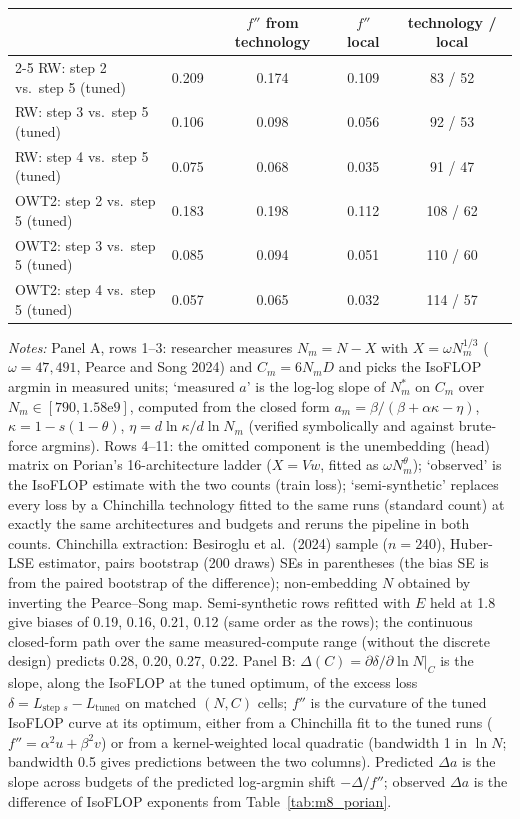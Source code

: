 \begin{table}[htbp]
\begin{threeparttable}
\begin{tabular}{p{6.0cm}cccc}
 & & $f''$ from technology & $f''$ local & technology / local  \\
\cmidrule(lr){2-5}
RW: step 2 vs.\ step 5 (tuned) & 0.209 & 0.174 & 0.109 & 83 / 52 \\
RW: step 3 vs.\ step 5 (tuned) & 0.106 & 0.098 & 0.056 & 92 / 53 \\
RW: step 4 vs.\ step 5 (tuned) & 0.075 & 0.068 & 0.035 & 91 / 47 \\
OWT2: step 2 vs.\ step 5 (tuned) & 0.183 & 0.198 & 0.112 & 108 / 62 \\
OWT2: step 3 vs.\ step 5 (tuned) & 0.085 & 0.094 & 0.051 & 110 / 60 \\
OWT2: step 4 vs.\ step 5 (tuned) & 0.057 & 0.065 & 0.032 & 114 / 57 \\
\bottomrule
\end{tabular}
\begin{tablenotes}[flushleft]
\footnotesize
\item \textit{Notes:} Panel A, rows 1--3: researcher measures $N_m=N-X$ with $X=\omega N_m^{1/3}$ ($\omega=47{,}491$, Pearce and Song 2024) and $C_m=6N_mD$ and picks the IsoFLOP argmin in measured units; `measured $a$' is the log-log slope of $N_m^*$ on $C_m$ over $N_m\in[790, 1.58\mathrm{e}9]$, computed from the closed form $a_m=\beta/(\beta+\alpha\kappa-\eta)$, $\kappa=1-s(1-\theta)$, $\eta=d\ln\kappa/d\ln N_m$ (verified symbolically and against brute-force argmins). Rows 4--11: the omitted component is the unembedding (head) matrix on Porian's 16-architecture ladder ($X=V w$, fitted as $\omega N_m^{\theta}$); `observed' is the IsoFLOP estimate with the two counts (train loss); `semi-synthetic' replaces every loss by a Chinchilla technology fitted to the same runs (standard count) at exactly the same architectures and budgets and reruns the pipeline in both counts. Chinchilla extraction: Besiroglu et al.\ (2024) sample ($n=240$), Huber-LSE estimator, pairs bootstrap (200 draws) SEs in parentheses (the bias SE is from the paired bootstrap of the difference); non-embedding $N$ obtained by inverting the Pearce--Song map. Semi-synthetic rows refitted with $E$ held at 1.8 give biases of 0.19, 0.16, 0.21, 0.12 (same order as the rows); the continuous closed-form path over the same measured-compute range (without the discrete design) predicts 0.28, 0.20, 0.27, 0.22. Panel B: $\Delta(C)=\partial\delta/\partial\ln N|_C$ is the slope, along the IsoFLOP at the tuned optimum, of the excess loss $\delta=L_{\text{step }s}-L_{\text{tuned}}$ on matched $(N,C)$ cells; $f''$ is the curvature of the tuned IsoFLOP curve at its optimum, either from a Chinchilla fit to the tuned runs ($f''=\alpha^2u+\beta^2v$) or from a kernel-weighted local quadratic (bandwidth 1 in $\ln N$; bandwidth 0.5 gives predictions between the two columns). Predicted $\Delta a$ is the slope across budgets of the predicted log-argmin shift $-\Delta/f''$; observed $\Delta a$ is the difference of IsoFLOP exponents from Table~\ref{tab:m8_porian}.
\end{tablenotes}
\end{threeparttable}
\end{table}
